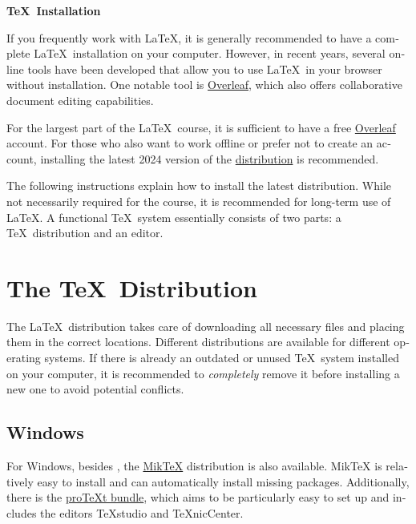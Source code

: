 \documentclass[
	ausgabe=2024-01-13,
	titel=Installation\ Instructions,
	shortverb=true,
	englisch=true,
]{../tex/latexkurs-exercise}
\begin{document}
\begin{center}
\sffamily\bfseries\Large \TeX\ Installation
\end{center}
\begin{english}

\noindent If you frequently work with \LaTeX, it is generally recommended to have a complete \LaTeX\ installation on your computer. However, in recent years, several online tools have been developed that allow you to use \LaTeX\ in your browser without installation. One notable tool is \href{https://qn3.de/tex00}{Overleaf}, which also offers collaborative document editing capabilities.

For the largest part of the \LaTeX\ course, it is sufficient to have a free \href{https://qn3.de/tex00}{Overleaf} account. For those who also want to work offline or prefer not to create an account, installing the latest 2024 version of the \href{https://www.tug.org/texlive/}{\TeXlive distribution} is recommended.

The following instructions explain how to install the latest \TeXlive distribution. While not necessarily required for the course, it is recommended for long-term use of \LaTeX. A functional \TeX\ system essentially consists of two parts: a \TeX\ distribution and an editor.

\section{The \TeX\ Distribution}

The \LaTeX\ distribution takes care of downloading all necessary files and placing them in the correct locations. Different distributions are available for different operating systems. If there is already an outdated or unused \TeX\ system installed on your computer, it is recommended to \emph{completely} remove it before installing a new one to avoid potential conflicts.

\subsection*{Windows}
For Windows, besides \href{https://www.tug.org/texlive/}{\TeXlive}, the \href{https://miktex.org/}{MikTeX} distribution is also available. MikTeX is relatively easy to install and can automatically install missing packages. Additionally, there is the \href{https://www.tug.org/protext/}{pro\TeX t bundle}, which aims to be particularly easy to set up and includes the editors TeXstudio and TeXnicCenter.


\end{english}
\end{document}
